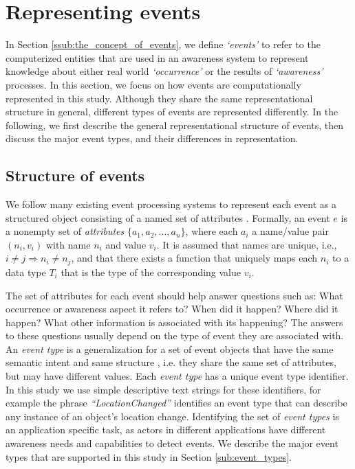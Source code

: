 \section{Representing events} %
\label{sec:representing_events}
In Section \ref{ssub:the_concept_of_events}, we define \emph{`events'} to refer to the computerized entities that are used in an awareness system to represent knowledge about either real world \emph{`occurrence'} or the results of \emph{`awareness'} processes. In this section, we focus on how events are computationally represented in this study. Although they share the same representational structure in general, different types of events are represented differently. In the following, we first describe the general representational structure of events, then discuss the major event types, and their differences in representation.

\subsection{Structure of events} %
\label{sub:defining_events}
We follow many existing event processing systems to represent each event as a structured object consisting of a named set of attributes \cite{Mhl2010}. Formally, an event $e$ is a nonempty set of \emph{attributes} $\{a_1, a_2, ..., a_n\}$, where each $a_i$ a name/value pair $(n_i, v_i)$ with name $n_i$ and value $v_i$. It is assumed that names are unique, i.e., $i\ne j \Rightarrow n_i\ne n_j$, and that there exists a function that uniquely maps each $n_i$ to a data type $T_i$ that is the type of the corresponding value $v_i$.

The set of attributes for each event should help answer questions such as: What occurrence or awareness aspect it refers to? When did it happen? Where did it happen? What other information is associated with its happening? The answers to these questions usually depend on the type of event they are associated with. An \emph{event type} is a generalization for a set of event objects that have the same semantic intent and same structure \cite{Etzion2010}, i.e. they share the same set of attributes, but may have different values. Each \emph{event type} has a unique event type identifier. In this study we use simple descriptive text strings for these identifiers, for example the phrase \emph{``LocationChanged''} identifies an event type that can describe any instance of an object's location change. Identifying the set of \emph{event types} is an application specific task, as actors in different applications have different awareness needs and capabilities to detect events. We describe the major event types that are supported in this study in Section \ref{sub:event_types}.

